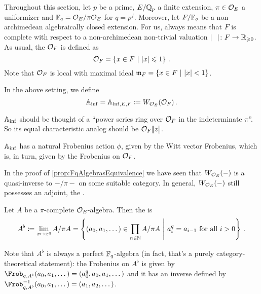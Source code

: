 \documentclass[a4paper, 10pt, oneside, DIV=9, chapterprefix=true, numbers=enddot,bibliography=totoc]{scrbook}
\begin{document}
Throughout this section, let $p$ be a prime, $E/\mathbb{Q}_p$ a finite extension, $\pi\in \mathcal{O}_E$ a uniformizer and $\mathbb{F}_q=\mathcal{O}_E/\pi\mathcal{O}_E$ for $q=p^f$. Moreover, let $F/\mathbb{F}_q$ be a non-archimedean algebraically closed extension. For us,  always means that $F$ is complete with respect to a non-archimedean non-trivial valuation $|\blank|\colon F\morphism\IR_{\geq 0}$. As usual, the  $\mathcal{O}_F$ is defined as
\begin{equation*}
	\mathcal{O}_F=\left\{x\in F\ \middle|\  |x|\leqslant 1\right\}\,.
\end{equation*}
Note that $\mathcal{O}_F$ is local with maximal ideal $\mathfrak{m}_F=\left\{x\in F\ \middle|\ |x|<1\right\}$.
\begin{defi}
	In the above setting, we define
	\begin{equation*}
		\mathbb{A}_{\mathrm{inf}}=\mathbb{A}_{\mathrm{inf},E,F}\coloneqq W_{\mathcal{O}_E}(\mathcal{O}_F)\,.
	\end{equation*}
\end{defi}
\begin{rem}
	\begin{numerate}
		\item $\mathbb{A}_{\mathrm{inf}}$ should be thought of a \enquote{power series ring over $\mathcal{O}_F$ in the indeterminate $\pi$}. So its equal characteristic analog should be $\mathcal{O}_F\llbracket z\rrbracket$.
		\item $\mathbb{A}_{\mathrm{inf}}$ has a natural Frobenius action $\phi$, given by the Witt vector Frobenius, which is, in turn, given by the Frobenius on $\mathcal{O}_F$.
	\end{numerate}
\end{rem}
In the proof of \cref{prop:FqAlgebrasEquivalence} we have seen that $W_{\mathcal{O}_E}(-)$ is a quasi-inverse to $-/\pi -$ on some suitable category. In general, $W_{\mathcal{O}_E}(-)$ still possesses an adjoint, the .
\begin{defi}
	Let $A$ be a $\pi$-complete $\mathcal{O}_E$-algebra. Then the  is
	\begin{equation*}
		A^\flat\coloneqq \lim_{x\mapsto x^q}A/\pi A=\left\{(a_0,a_1,\dotsc)\in\prod_{n\in\mathbb{N}}A/\pi A\ \middle|\  a_i^q=a_{i-1}\text{ for all }i>0\right\}\,.
	\end{equation*}
\end{defi}
Note that $A^\flat$ is always a perfect $\mathbb{F}_q$-algebra (in fact, that's a purely category-theoretical statement): the Frobenius on $A^\flat$ is given by $\Frob_{q,A^\flat}(a_0,a_1,\dotsc)=(a_0^q,a_0,a_1,\dotsc)$ and it has an inverse defined by $\Frob_{q,A^\flat}^{-1}(a_0,a_1,\dotsc)=(a_1,a_2,\dotsc)$.
\end{document}
